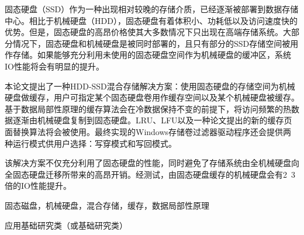 
\begin{cabstract}

固态硬盘（SSD）作为一种出现相对较晚的存储介质，已经逐渐被部署到数据存储中心。相比于机械硬盘（HDD），固态硬盘有着体积小、功耗低以及访问速度快的优势。但是，固态硬盘的高昂价格使其大多数情况下只出现在高端存储系统。大部分情况下，固态硬盘和机械硬盘是被同时部署的，且只有部分的SSD存储空间被用作存储。如果能够充分利用未使用的固态硬盘空间作为机械硬盘的缓冲区，系统IO性能将会有明显的提升。

本论文提出了一种HDD-SSD混合存储解决方案：使用固态硬盘的存储空间为机械硬盘做缓存，用户可指定某个固态硬盘卷用作缓存空间以及某个机械硬盘被缓存。基于数据局部性原理的缓存算法会在冷数据保持不变的前提下，将访问频繁的热数据逐渐由机械硬盘复制到固态硬盘。LRU、LFU以及一种论文提出的新的缓存页面替换算法将会被使用。最终实现的Windows存储卷过滤器驱动程序还会提供两种运行模式供用户选择：写穿模式和写回模式。

该解决方案不仅充分利用了固态硬盘的性能，同时避免了存储系统由全机械硬盘向全固态硬盘迁移所带来的高昂开销。经测试，由固态硬盘缓存的机械硬盘会有2~3倍的IO性能提升。

\end{cabstract}

\begin{ckeywords}
固态磁盘，机械硬盘，混合存储，缓存，数据局部性原理
\end{ckeywords}

\begin{cthesistype}
应用基础研究类（或基础研究类）
\end{cthesistype}


